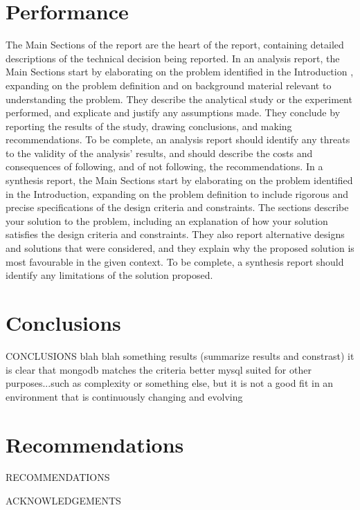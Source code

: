 \documentclass[12pt]{article}
\begin{document}
\section{Performance}
The Main Sections of the report are the heart of the report, containing detailed descriptions of the technical decision being reported. In an analysis report, the Main Sections start by elaborating on the problem identified in the Introduction , expanding on the problem definition and on background material relevant to understanding the problem. They describe the analytical study or the experiment performed, and explicate and justify any assumptions made. They conclude by reporting the results of the study, drawing conclusions, and making recommendations. To be complete, an analysis report should identify any threats to the validity of the analysis' results, and should describe the costs and consequences of following, and of not following, the recommendations. In a synthesis report, the Main Sections start by elaborating on the problem identified in the Introduction, expanding on the problem definition to include rigorous and precise specifications of the design criteria and constraints. The sections describe your solution to the problem, including an explanation of how your solution satisfies the design criteria and constraints. They also report alternative designs and solutions that were considered, and they explain why the proposed solution is most favourable in the given context. To be complete, a synthesis report should identify any limitations of the solution proposed.



\section{Conclusions}
CONCLUSIONS
blah blah something results (summarize results and constrast)
it is clear that mongodb matches the criteria better
mysql suited for other purposes...such as complexity or something else, but it is not a good fit in an environment that is continuously changing and evolving
\cite{smpl}

\section{Recommendations}
RECOMMENDATIONS

\newpage



\newpage


ACKNOWLEDGEMENTS
\newpage
\end{document}
